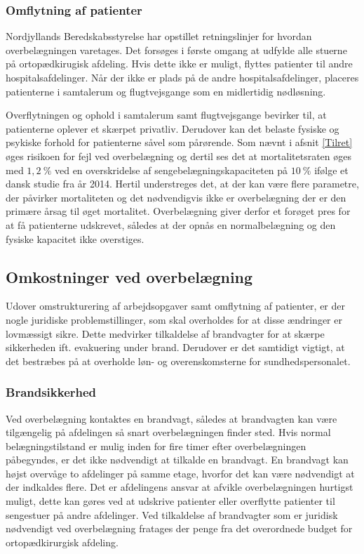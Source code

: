 \subsubsection{Omflytning af patienter}
Nordjyllands Beredskabsstyrelse har opstillet retningslinjer for hvordan overbelægningen varetages. Det forsøges i første omgang at udfylde alle stuerne på ortopædkirugisk afdeling. Hvis dette ikke er muligt, flyttes patienter til andre hospitalsafdelinger. Når der ikke er plads på de andre hospitalsafdelinger, placeres patienterne i samtalerum og flugtvejsgange som en midlertidig nødløsning.\cite{Beredskab2016} 

Overflytningen og ophold i samtalerum samt flugtvejsgange bevirker til, at patienterne oplever et skærpet privatliv.\cite{Madsen2014} Derudover kan det belaste fysiske og psykiske forhold for patienterne såvel som pårørende.\cite{Heidmann2014} Som nævnt i afsnit \ref{Tilret} øges risikoen for fejl ved overbelægning og dertil ses det at mortalitetsraten øges med $1,2~\%$ ved en overskridelse af sengebelægningskapaciteten på $10~\%$ ifølge et dansk studie fra år 2014. \cite{Madsen2014} Hertil understreges det, at der kan være flere parametre, der påvirker mortaliteten og det nødvendigvis ikke er overbelægning der er den primære årsag til øget mortalitet. Overbelægning giver derfor et forøget pres for at få patienterne udskrevet, således at der opnås en normalbelægning og  den fysiske kapacitet ikke overstiges.

\subsection{Omkostninger ved overbelægning}
Udover omstrukturering af arbejdsopgaver samt omflytning af patienter, er der nogle juridiske problemstillinger, som skal overholdes for at disse ændringer er lovmæssigt sikre. Dette medvirker tilkaldelse af brandvagter for at skærpe sikkerheden ift. evakuering under brand. Derudover er det samtidigt vigtigt, at det bestræbes på at overholde løn- og overenskomsterne for sundhedspersonalet.

\subsubsection{Brandsikkerhed}
Ved overbelægning kontaktes en brandvagt, således at brandvagten kan være tilgængelig på afdelingen så snart overbelægningen finder sted. Hvis normal belægningstilstand er mulig inden for fire timer efter overbelægningen påbegyndes, er det ikke nødvendigt at tilkalde en brandvagt. En brandvagt kan højst overvåge to afdelinger på samme etage, hvorfor det kan være nødvendigt at der indkaldes flere. Det er afdelingens ansvar at afvikle overbelægningen hurtigst muligt, dette kan gøres ved at udskrive patienter eller overflytte patienter til sengestuer på andre afdelinger.\cite{Beredskab2016} Ved tilkaldelse af brandvagter som er juridisk nødvendigt ved overbelægning fratages der penge fra det overordnede budget for ortopædkirurgisk afdeling. 

